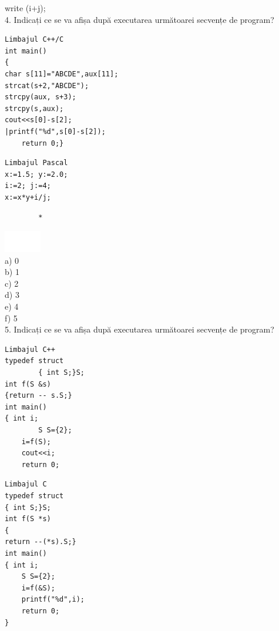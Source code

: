 \documentclass[10pt]{article}
\begin{document}
write (i+j);\\
4. Indicați ce se va afișa după executarea următoarei secvențe de program?

\begin{verbatim}
Limbajul C++/C
int main()
{
char s[11]="ABCDE",aux[11];
strcat(s+2,"ABCDE");
strcpy(aux, s+3);
strcpy(s,aux);
cout<<s[0]-s[2];
|printf("%d",s[0]-s[2]);
    return 0;}
\end{verbatim}

\begin{verbatim}
Limbajul Pascal
x:=1.5; y:=2.0;
i:=2; j:=4;
x:=x*y+i/j;
\end{verbatim}

\begin{verbatim}
        *
\end{verbatim}

\includegraphics[max width=\textwidth, center]{2025_04_17_46e04c6acd873ea9558dg-235}\\
a) 0\\
b) 1\\
c) 2\\
d) 3\\
e) 4\\
f) 5\\
5. Indicați ce se va afișa după executarea următoarei secvențe de program?

\begin{verbatim}
Limbajul C++
typedef struct
        { int S;}S;
int f(S &s)
{return -- s.S;}
int main()
{ int i;
        S S={2};
    i=f(S);
    cout<<i;
    return 0;
\end{verbatim}

\begin{verbatim}
Limbajul C
typedef struct
{ int S;}S;
int f(S *s)
{
return --(*s).S;}
int main()
{ int i;
    S S={2};
    i=f(&S);
    printf("%d",i);
    return 0;
}
\end{verbatim}
\end{document}
